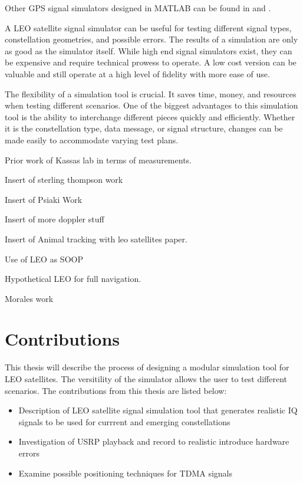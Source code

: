 \documentclass[12pt]{report}
\begin{document}
Other GPS signal simulators designed in MATLAB can be found in  \cite{dongIFGPSSignal2003} and \cite{corbellDesignValidationAccurate2000}.

A LEO satellite signal simulator can be useful for testing different signal types, constellation geometries, and possible errors. The results of a simulation are only as good as the simulator itself. While high end signal simulators exist, they can be expensive and require technical prowess to operate. A low cost version can be valuable and still operate at a high level of fidelity with more ease of use. 



The flexibility of a simulation tool is crucial. It saves time, money, and resources when testing different scenarios. One of the biggest advantages to this simulation tool is the ability to interchange different pieces quickly and efficiently. Whether it is the constellation type, data message, or signal structure, changes can be made easily to accommodate varying test plans.

Prior work of Kassas lab in terms of measurements. 

Insert of sterling thompson work 

Insert of Psiaki Work \cite{psiakiNavigationUsingCarrier2021}

Insert of more doppler stuff \cite{hsuAssessmentUsingDoppler2014}

Insert of Animal tracking with leo satellites paper. \cite{lopezImprovingArgosDoppler2014}

Use of LEO as SOOP \cite{khalifeReceiverDesignDoppler2019} \cite{tanNewMethodPositioning2019}

Hypothetical LEO for full navigation. \cite{reidSatelliteNavigationAge2020}

Morales work \cite{moralesInertialNavigationSystem2018}

\section { Contributions}
This thesis will describe the process of designing a modular simulation tool for LEO satellites. The versitility of the simulator allows the user to test different scenarios. 
The contributions from this thesis are listed below:
\begin{itemize}
    \item Description of LEO satellite signal simulation tool that generates realistic IQ signals to be used for currrent and emerging constellations
    \item Investigation of USRP playback and record to realistic introduce hardware errors
    \item Examine possible positioning techniques for TDMA signals
    
\end{itemize}
\end{document}
